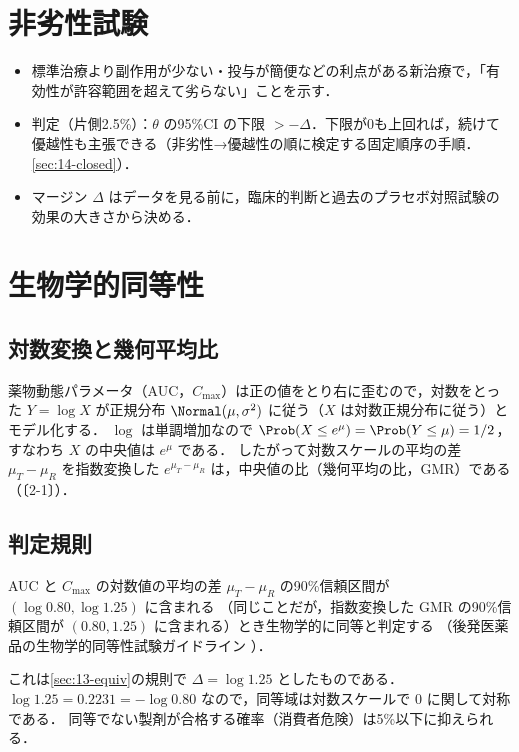 \section{非劣性試験}\label{sec:13-ni}
\begin{itemize}
\item 標準治療より副作用が少ない・投与が簡便などの利点がある新治療で，「有効性が許容範囲を超えて劣らない」ことを示す．
\item 判定（片側2.5\%）：$\theta$ の95\%CI の下限 $>-\Delta$．下限が0も上回れば，続けて優越性も主張できる（非劣性→優越性の順に検定する固定順序の手順．\cref{sec:14-closed}）．
\item マージン $\Delta$ はデータを見る前に，臨床的判断と過去のプラセボ対照試験の効果の大きさから決める．
\end{itemize}

\section{生物学的同等性}\label{sec:13-be}
\Hissu\Hinshutsu
\subsection{対数変換と幾何平均比}
薬物動態パラメータ（AUC，$C_{\max}$）は正の値をとり右に歪むので，対数をとった $Y=\log X$ が正規分布 $\Normal(\mu,\sigma^2)$ に従う（$X$ は対数正規分布に従う）とモデル化する．
$\log$ は単調増加なので $\Prob(X\le e^\mu)=\Prob(Y\le\mu)=1/2$，すなわち $X$ の中央値は $e^\mu$ である．
したがって対数スケールの平均の差 $\mu_T-\mu_R$ を指数変換した $e^{\mu_T-\mu_R}$ は，中央値の比（幾何平均の比，GMR）である（〔2-1〕）．

\subsection{判定規則}
\begin{pointbox}
AUC と $C_{\max}$ の対数値の平均の差 $\mu_T-\mu_R$ の90\%信頼区間が $(\log0.80,\log1.25)$ に含まれる
（同じことだが，指数変換した GMR の90\%信頼区間が $(0.80,1.25)$ に含まれる）とき生物学的に同等と判定する
（後発医薬品の生物学的同等性試験ガイドライン \cite{jp:be}）．
\end{pointbox}
これは\cref{sec:13-equiv}の規則で $\Delta=\log1.25$ としたものである．$\log1.25=0.2231=-\log0.80$ なので，同等域は対数スケールで $0$ に関して対称である．
同等でない製剤が合格する確率（消費者危険）は5\%以下に抑えられる．
